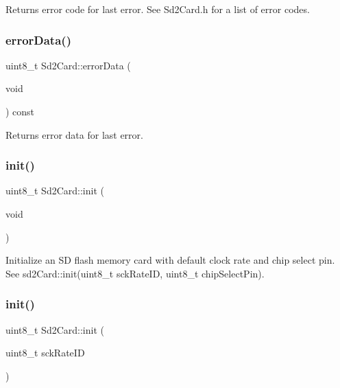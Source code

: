 \begin{DoxyReturn}{Returns}
error code for last error. See Sd2\+Card.\+h for a list of error codes. 
\end{DoxyReturn}
\mbox{\label{class_sd2_card_a51f51804473a8fefd29cabbc36018a49}} 
\subsubsection{\texorpdfstring{error\+Data()}{errorData()}}
{\footnotesize\ttfamily uint8\+\_\+t Sd2\+Card\+::error\+Data (\begin{DoxyParamCaption}\item[{void}]{ }\end{DoxyParamCaption}) const\hspace{0.3cm}{\ttfamily [inline]}}

\begin{DoxyReturn}{Returns}
error data for last error. 
\end{DoxyReturn}
\mbox{\label{class_sd2_card_afaec9a22060626b02c07a09eff2e9113}} 
\subsubsection{\texorpdfstring{init()}{init()}\hspace{0.1cm}{\footnotesize\ttfamily [1/3]}}
{\footnotesize\ttfamily uint8\+\_\+t Sd2\+Card\+::init (\begin{DoxyParamCaption}\item[{void}]{ }\end{DoxyParamCaption})\hspace{0.3cm}{\ttfamily [inline]}}

Initialize an SD flash memory card with default clock rate and chip select pin. See sd2\+Card\+::init(uint8\+\_\+t sck\+Rate\+I\+D, uint8\+\_\+t chip\+Select\+Pin). \mbox{\label{class_sd2_card_ad99b2d2156c9746065c52839ef679354}} 
\subsubsection{\texorpdfstring{init()}{init()}\hspace{0.1cm}{\footnotesize\ttfamily [2/3]}}
{\footnotesize\ttfamily uint8\+\_\+t Sd2\+Card\+::init (\begin{DoxyParamCaption}\item[{uint8\+\_\+t}]{sck\+Rate\+ID }\end{DoxyParamCaption})\hspace{0.3cm}{\ttfamily [inline]}}

